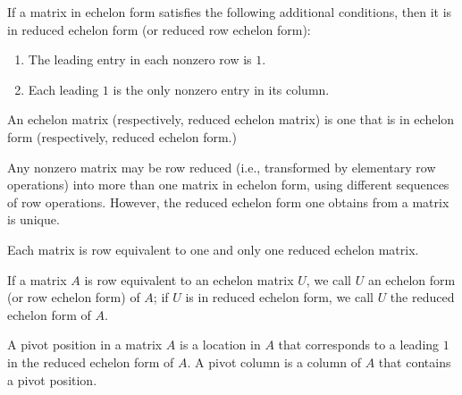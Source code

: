 \documentclass[../linalg.tex]{subfiles}
\begin{document}
If a matrix in echelon form satisfies the following additional conditions, then it is in reduced echelon form (or reduced row echelon form):
\begin{enumerate}
    \item The leading entry in each nonzero row is $1$.
    \item Each leading $1$ is the only nonzero entry in its column.
\end{enumerate}

An echelon matrix (respectively, reduced echelon matrix) is one that is in echelon form (respectively, reduced echelon form.)

Any nonzero matrix may be row reduced (i.e., transformed by elementary row operations) into more than one matrix in echelon form, using different sequences of row operations. However, the reduced echelon form one obtains from a matrix is unique.

\begin{theorem}
    Each matrix is row equivalent to one and only one reduced echelon matrix.
\end{theorem}

If a matrix $A$ is row equivalent to an echelon matrix $U$, we call $U$ an echelon form (or row echelon form) of $A$; if $U$ is in reduced echelon form, we call $U$ the reduced echelon form of $A$.

A pivot position in a matrix $A$ is a location in $A$ that corresponds to a leading $1$ in the reduced echelon form of $A$. A pivot column is a column of $A$ that contains a pivot position.
\end{document}
